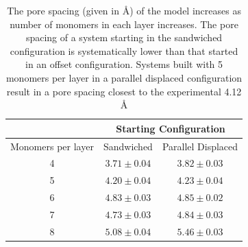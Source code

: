 \documentclass{article}
\newcommand{\angstrom}{\textup{\AA}}
\begin{document}
  \begin{table}[h]
  \centering
  \begin{tabular}{ccc}
  \toprule
  		   & \multicolumn{2}{c}{Starting Configuration} \\
  \hline
  Monomers per layer & Sandwiched & Parallel Displaced \\
  \midrule
  4 & $3.71 \pm 0.04$ & $3.82 \pm 0.03$ \\
  5 & $4.20 \pm 0.04$ & $4.23 \pm 0.04$ \\
  6 & $4.83 \pm 0.03$ & $4.85 \pm 0.02$ \\
  7 & $4.73 \pm 0.03$ & $4.84 \pm 0.03$ \\
  8 & $5.08 \pm 0.04$ & $5.46 \pm 0.03$ \\
  \bottomrule
  \end{tabular}
  \caption{The pore spacing 
  (given in \angstrom)
  of the model increases as number of monomers
  in each layer increases. The pore spacing of a system starting in the 
  sandwiched configuration is systematically lower than that started in an 
  offset configuration. Systems built with 5 monomers per layer in a parallel
  displaced configuration result in a pore spacing closest 
  to the experimental 4.12 \angstrom}\label{table:p2p} 
  \end{table}
  
\end{document}
